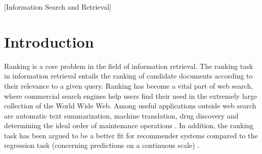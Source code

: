 \documentclass{sig-alternate}
\begin{document}
\maketitle
\begin{abstract}
Learning to rank is an increasingly important scientific field that comprises the use of machine learning for the ranking task. New learning to rank methods are generally evaluated on benchmark test collections. However, comparison of learning to rank methods based on evaluation results is hindered by non-existence of a standard set of evaluation benchmark collections. In this paper we propose a way to compare learning to rank methods based on a sparse set of evaluation results on a set of benchmark datasets. Our comparison methodology consists of two components: 1) Normalized Winning Number, which gives insight in the ranking accuracy of the learning to rank method, and 2) Ideal Winning Number, which gives insight in the degree of certainty concerning its ranking accuracy. Evaluation results of 87 learning to rank methods on 20 well-known benchmark datasets are collected through a structured literature search. ListNet, SmoothRank, FenchelRank, FSMRank, LRUF and LARF are the best performing learning to rank methods in increasing order of Normalized Winning Number and decreasing order of Ideal Winning Number.
\end{abstract}

[Information Search and Retrieval]


\section{Introduction}
Ranking is a core problem in the field of information retrieval. The ranking task in information retrieval entails the ranking of candidate documents according to their relevance to a given query. Ranking has become a vital part of web search, where commercial search engines help users find their need in the extremely large collection of the World Wide Web. Among useful applications outside web search are automatic text summarization, machine translation, drug discovery and determining the ideal order of maintenance operations \cite{Rudin2009}. In addition, the ranking task has been argued to be a better fit for recommender systems compared to the regression task (concerning predictions on a continuous scale) \cite{McNee2006}.\\
\end{document}
